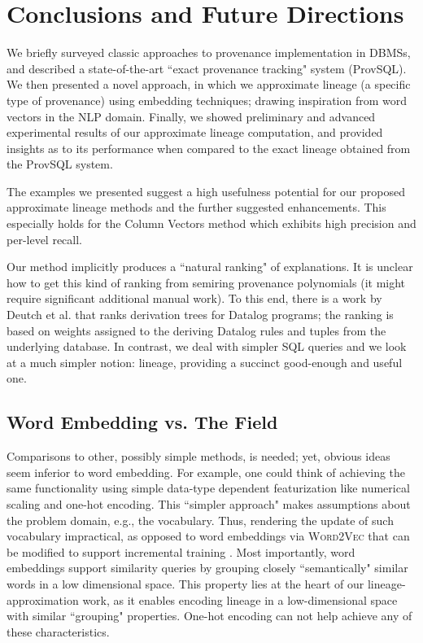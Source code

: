 \chapter{Conclusions and Future Directions}
\label{chap:conclusions}

We briefly surveyed classic approaches to provenance implementation in DBMSs, and described a state-of-the-art ``exact provenance tracking" system (ProvSQL). We then presented a novel approach, in which we approximate lineage (a specific type of provenance) using embedding techniques; drawing inspiration from word vectors in the NLP domain. Finally, we showed preliminary and advanced experimental results of our approximate lineage computation, and provided insights as to its performance when compared to the exact lineage obtained from the  ProvSQL system. 
\par The examples we presented suggest a high usefulness potential for our proposed approximate lineage methods and the further suggested enhancements.
This especially holds for the Column Vectors method which exhibits high precision and per-level recall.
\par Our method implicitly produces a ``natural ranking" of explanations. It is unclear how to get this kind of ranking from semiring provenance polynomials (it might require significant additional manual work). To this end, there is a work by Deutch et al. \cite{Deutch2015} that ranks derivation trees for Datalog programs; the ranking is  based on weights assigned to the deriving Datalog rules and tuples from the underlying database. In contrast, we deal with simpler SQL queries and we look at a much simpler notion: lineage, providing a succinct good-enough and useful one.

\section{Word Embedding vs. The Field}
Comparisons to other, possibly simple methods, is needed; yet, obvious ideas seem inferior to word embedding. For example, one could think of achieving the same functionality using simple data-type dependent featurization like numerical scaling and one-hot encoding.
This ``simpler approach" makes assumptions about the problem domain, e.g., the vocabulary. Thus, rendering the update of such vocabulary impractical, as opposed to word embeddings via \textsc{Word2Vec} that can be modified to support incremental training \cite{w2v_incremental}.
Most importantly, word embeddings support similarity queries by grouping closely ``semantically" similar words in a low dimensional space. This property lies at the heart of our lineage-approximation work, as it enables encoding lineage in a low-dimensional space with similar ``grouping" properties. One-hot encoding can not help achieve any of these characteristics.\\

